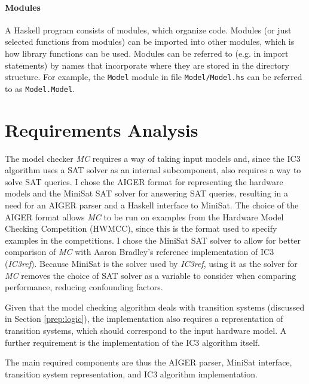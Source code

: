 \documentclass[12pt,a4paper,twoside,openright]{report}
\begin{document}
\paragraph{Modules}{
A Haskell program consists of modules, which organize code.
Modules (or just selected functions from modules) can be imported into other
modules, which is how library functions can be used. Modules can be referred
to (e.g. in import statements) by names that incorporate where they are
stored in the directory structure. For example, the \verb,Model, module in file
\verb,Model/Model.hs, can be referred to as \verb,Model.Model,.
}


\section{Requirements Analysis}
\label{prep:requirements}


The model checker \emph{MC} requires a way of taking input models and, since
the IC3 algorithm uses a SAT solver as an internal subcomponent, also
requires a way to solve SAT queries.
I chose the AIGER format for representing the hardware models and the
MiniSat SAT solver for answering SAT queries, resulting in a need for an
AIGER parser and a Haskell interface to MiniSat. The choice of
the AIGER format allows \emph{MC} to be run on examples from
the Hardware Model Checking Competition (HWMCC), since this is the format used
to specify examples in the competitions. I chose the MiniSat SAT
solver to allow for better comparison of \emph{MC}
with Aaron Bradley's reference implementation of IC3 (\emph{IC3ref})\cite{refic3}.
Because MiniSat is the solver used by \emph{IC3ref}, using it as the solver
for \emph{MC} removes the
choice of SAT solver as a variable to consider when comparing performance,
reducing confounding factors.

Given that the model checking algorithm deals with transition systems
(discussed in Section \ref{prep:logic}), the implementation also requires a representation of
transition systems, which should correspond to the input hardware model.
A further requirement is the implementation of the
IC3 algorithm itself.

The main required components are thus the AIGER parser, MiniSat interface,
transition system representation, and IC3 algorithm implementation.
\end{document}
